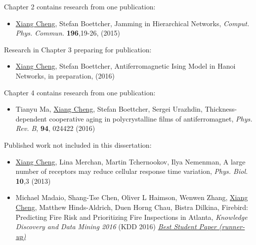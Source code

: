 \begin{prev_citation}
\noindent Chapter 2 contains research from one publication:
\begin{itemize}
\item \underline{Xiang Cheng}, Stefan Boettcher, Jamming in Hierarchical Networks, {\it Comput. Phys. Commun.} {\bf 196},19-26, (2015)
\end{itemize}

\noindent Research in Chapter 3 preparing for publication:
\begin{itemize}
\item \underline{Xiang Cheng}, Stefan Boettcher, Antiferromagnetic Ising Model in Hanoi Networks, in preparation, (2016)
\end{itemize}

\noindent Chapter 4 contains research from one publication:
\begin{itemize}
\item  Tianyu Ma, \underline{Xiang Cheng}, Stefan Boettcher, Sergei Urazhdin, Thickness-dependent cooperative aging in polycrystalline films of antiferromagnet, {\it Phys. Rev. B},   {\bf 94}, 024422 (2016)
\end{itemize}


\noindent Published work not included in this dissertation:
\begin{itemize}
\item  \underline{Xiang Cheng}, Lina Merchan, Martin Tchernookov, Ilya Nemenman, A large number of receptors may reduce cellular response time variation, {\it Phys. Biol.}  {\bf 10},3 (2013)

\item  Michael Madaio, Shang-Tse Chen, Oliver L Haimson, Wenwen Zhang, \underline{Xiang Cheng}, Matthew Hinds-Aldrich, Duen Horng Chau, Bistra Dilkina, Firebird: Predicting Fire Risk and Prioritizing Fire Inspections in Atlanta, {\it  Knowledge Discovery and Data Mining 2016} (KDD 2016) \underline{\it Best Student Paper (runner-up)}
\end{itemize}

\end{prev_citation}

\pagestyle{fancy}
